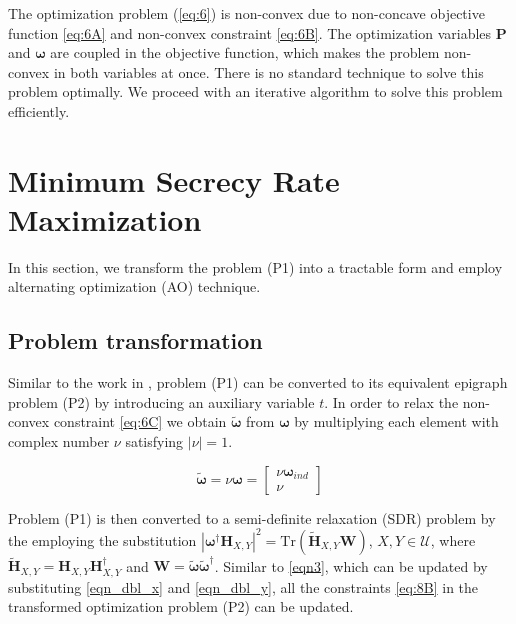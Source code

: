 \documentclass[lettersize,journal]{IEEEtran}
\begin{document}
The optimization problem (\ref{eq:6}) is non-convex due to non-concave objective function \eqref{eq:6A} and non-convex constraint \eqref{eq:6B}. The optimization variables $\mathbf{P}$ and $\boldsymbol{\omega}$ are coupled in the objective function, which makes the problem non-convex in both variables at once. There is no standard technique to solve this problem optimally. We proceed with an iterative algorithm to solve this problem efficiently.

\section{Minimum Secrecy Rate Maximization}

In this section, we transform the problem (P1) into a tractable form and employ alternating optimization (AO) technique.

\subsection{Problem transformation}

Similar to the work in \cite{atapattu2020}, problem (P1) can be converted to its equivalent epigraph problem (P2) by introducing an auxiliary variable $t$. In order to relax the non-convex constraint \eqref{eq:6C} we obtain $\tilde{\boldsymbol{\omega}}$ from $\boldsymbol{\omega}$ by multiplying each element with complex number $\nu$ satisfying $|\nu| = 1$.

\begin{equation}
\label{eqn4}
\tilde{\boldsymbol{\omega}} = \nu \boldsymbol{\omega} = \begin{bmatrix} \nu \boldsymbol{\omega}_{ind} \\ \nu  \end{bmatrix}
\end{equation}

Problem (P1) is then converted to a semi-definite relaxation (SDR) problem by the employing the substitution $|\boldsymbol{\omega}^\dag \mathbf{H}_{X,Y}|^2 = \text{Tr}(\mathbf{\tilde{H}}_{X,Y} \boldsymbol{W})$, $X,Y \in \mathcal{U}$, where $\mathbf{\tilde{H}}_{X,Y} = \mathbf{H}_{X,Y} \mathbf{H}_{X,Y}^\dag$ and  $\boldsymbol{W} = \tilde{\boldsymbol{\omega}} \tilde{\boldsymbol{\omega}}^\dag$. Similar to \eqref{eqn3}, which can be updated by substituting \eqref{eqn_dbl_x} and \eqref{eqn_dbl_y}, all the constraints \eqref{eq:8B} in the transformed optimization problem (P2) can be updated.
\end{document}
